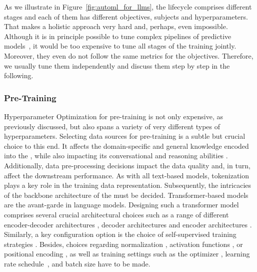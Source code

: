 \documentclass[10pt]{article} %
\begin{document}
As we illustrate in Figure~\ref{fig:automl_for_llms}, the \LLM lifecycle comprises different stages and each of them has different objectives, subjects and hyperparameters. That makes a holistic \AutoML approach very hard and, perhaps, even impossible. Although it is in principle possible to tune complex pipelines of predictive models~\citep{wachsmuth-cicl13a,feurer-nips15a,wever-automl18a,olson-automl19a}, it would be too expensive to tune all stages of the \LLM training jointly. Moreover, they even do not follow the same metrics for the objectives. Therefore, we usually tune them independently and discuss them step by step in the following.

\subsubsection{Pre-Training}

Hyperparameter Optimization for pre-training is not only expensive, as previously discussed, but also spans a variety of very different types of hyperparameters.  
Selecting data sources for pre-training is a subtle but crucial choice to this end. 
It affects the domain-specific and general knowledge encoded into the \LLM, while also impacting its conversational and reasoning abilities \citep{zhao-arxiv23a}.
Additionally, data pre-processing decisions impact the data quality and, in turn, affect the downstream performance. 
As with all text-based models, tokenization \citep{schuster-ieee2012, sennrich-acl2016a, kudo-acl2018a} plays a key role in the training data representation.
Subsequently, the intricacies of the backbone architecture of the \LLM must be decided. 
Transformer-based models \citep{vaswani-neurips17a} are the avant-garde in language models.
Designing such a transformer model comprises several crucial architectural choices such as a range of different encoder-decoder architectures \citep{vaswani-neurips17a, lewis-acl20a}, decoder architectures \citep{brown-neurips20a, zhang-arxiv2022a} and encoder architectures \citep{devlin-acl19a,liu-arxiv19a}.
Similarly, a key configuration option is the choice of self-supervised training strategies \citep{lewis-acl20a}. Besides, choices regarding normalization \citep{ba-arxiv2016a, xiong-icml20a}, activation functions \citep{hendrycks-arxiv2016a, shazeer-arxiv2020a}, or positional encoding \citep{su-arxiv2022}, as well as training settings such as the optimizer \citep{kingma-iclr15a, loshchilov-iclr18a, shazeer-icml18a}, learning rate schedule~\citep{loshchilov-iclr17a}, and batch size have to be made. 
\end{document}
